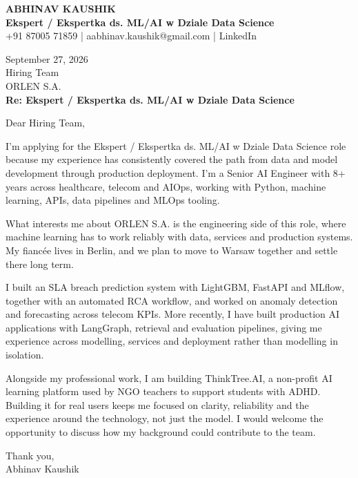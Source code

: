 \documentclass[10pt,a4paper]{article}
\begin{document}
\begin{center}
{\Large\bfseries ABHINAV KAUSHIK}\\[2pt]
{\bfseries Ekspert / Ekspertka ds. ML/AI w Dziale Data Science}\\[2pt]
+91 87005 71859 \quad | \quad aabhinav.kaushik@gmail.com \quad | \quad LinkedIn
\end{center}
\vspace{8pt}
September 27, 2026\\[6pt]
Hiring Team\\
ORLEN S.A.\\[4pt]
\textbf{Re: Ekspert / Ekspertka ds. ML/AI w Dziale Data Science}

Dear Hiring Team,

I’m applying for the Ekspert / Ekspertka ds. ML/AI w Dziale Data Science role because my experience has consistently covered the path from data and model development through production deployment. I’m a Senior AI Engineer with 8+ years across healthcare, telecom and AIOps, working with Python, machine learning, APIs, data pipelines and MLOps tooling.

What interests me about ORLEN S.A. is the engineering side of this role, where machine learning has to work reliably with data, services and production systems. My fiancée lives in Berlin, and we plan to move to Warsaw together and settle there long term.

I built an SLA breach prediction system with LightGBM, FastAPI and MLflow, together with an automated RCA workflow, and worked on anomaly detection and forecasting across telecom KPIs. More recently, I have built production AI applications with LangGraph, retrieval and evaluation pipelines, giving me experience across modelling, services and deployment rather than modelling in isolation.

Alongside my professional work, I am building ThinkTree.AI, a non-profit AI learning platform used by NGO teachers to support students with ADHD. Building it for real users keeps me focused on clarity, reliability and the experience around the technology, not just the model. I would welcome the opportunity to discuss how my background could contribute to the team.

Thank you,\\
Abhinav Kaushik
\end{document}
